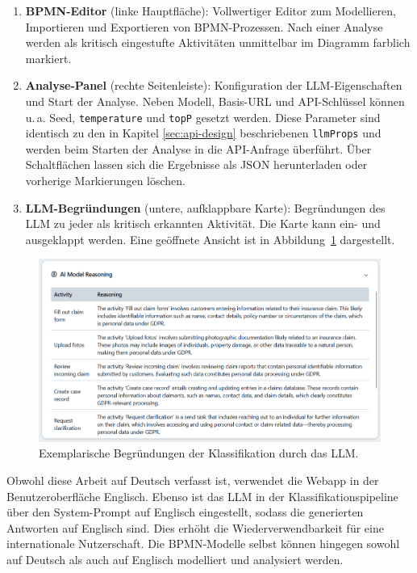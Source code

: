 \begin{enumerate}
    \item \textbf{BPMN-Editor} (linke Hauptfläche): Vollwertiger Editor zum Modellieren, Importieren und Exportieren von \ac{BPMN}-Prozessen. Nach einer Analyse werden als kritisch eingestufte Aktivitäten unmittelbar im Diagramm farblich markiert.
    \item \textbf{Analyse-Panel} (rechte Seitenleiste): Konfiguration der \ac{LLM}-Eigenschaften und Start der Analyse. Neben Modell, Basis-URL und API-Schlüssel können u.\,a. Seed, \texttt{temperature} und \texttt{topP} gesetzt werden. Diese Parameter sind identisch zu den in Kapitel \ref{sec:api-design} beschriebenen \texttt{llmProps} und werden beim Starten der Analyse in die API-Anfrage überführt. Über Schaltflächen lassen sich die Ergebnisse als JSON herunterladen oder vorherige Markierungen löschen.
    \item \textbf{\ac{LLM}-Begründungen} (untere, aufklappbare Karte): Begründungen des \ac{LLM} zu jeder als kritisch erkannten Aktivität. Die Karte kann ein- und ausgeklappt werden. Eine geöffnete Ansicht ist in Abbildung~\ref{fig:sandbox-frontend-ai-reasoning} dargestellt.
\end{enumerate}

\begin{figure}[h]
    \centering
    \includegraphics[width=.86\linewidth]{images/sandbox/sandbox-ai-reasoning}
    \caption{Exemplarische Begründungen der Klassifikation durch das LLM.}
    \label{fig:sandbox-frontend-ai-reasoning}
\end{figure}

Obwohl diese Arbeit auf Deutsch verfasst ist, verwendet die Webapp in der Benutzeroberfläche Englisch. Ebenso ist das \ac{LLM} in der Klassifikationspipeline über den System-Prompt auf Englisch eingestellt, sodass die generierten Antworten auf Englisch sind. Dies erhöht die Wiederverwendbarkeit für eine internationale Nutzerschaft. Die \ac{BPMN}-Modelle selbst können hingegen sowohl auf Deutsch als auch auf Englisch modelliert und analysiert werden.